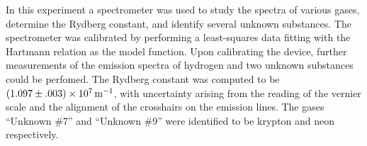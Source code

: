 
\physics

\begin{paperabs}
In this experiment a spectrometer was used to study the spectra of various gases, determine the Rydberg constant, and identify several unknown substances.
The spectrometer was calibrated by performing a least-squares data fitting with the Hartmann relation as the model function. Upon calibrating the device, further measurements of the emission spectra of hydrogen and two unknown substances could be perfomed. 
The Rydberg constant was computed to be $(1.097\pm.003)\times\SI{E7}{\per\meter}$, with uncertainty arising from the reading of the vernier scale and the alignment of the crosshairs on the emission lines. 
The gases ``Unknown \#7'' and ``Unknown \#9'' were identified to be krypton and neon respectively. 
\end{paperabs}

